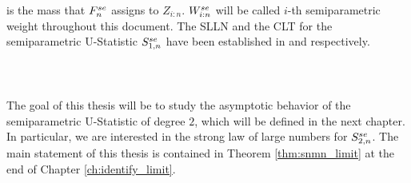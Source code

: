 is the mass that $F_n^{se}$ assigns to $Z_{i:n}$. $W_{i:n}^{se}$ will be called $i$-th semiparametric weight throughout this document. The SLLN and the CLT for the semiparametric U-Statistic $S_{1,n}^{se}$ have been established in \citet{dikta2000strong} and \citet{dikta2005central} respectively.\\
\\
 \cite{dikta1998semiparametric}\\
\\
The goal of this thesis will be to study the asymptotic behavior of the semiparametric U-Statistic of degree $2$, which will be defined in the next chapter. In particular, we are interested in the strong law of large numbers for $S_{2,n}^{se}$. The main statement of this thesis is contained in Theorem \ref{thm:snmn_limit} at the end of Chapter \ref{ch:identify_limit}.\\
\\
%
